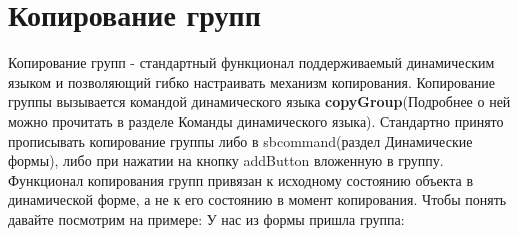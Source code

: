 \documentclass[../index.tex]{subfiles}
\begin{document}
\section{Копирование групп}

Копирование групп - стандартный функционал поддерживаемый динамическим языком и позволяющий гибко настраивать механизм копирования. Копирование группы вызывается командой динамического языка \textbf{copyGroup}(Подробнее о ней можно прочитать в разделе Команды динамического языка). Стандартно принято прописывать копирование группы либо в sbcommand(раздел Динамические формы), либо при нажатии на кнопку addButton вложенную в группу.
Функционал копирования групп привязан к исходному состоянию объекта в динамической форме, а не к его состоянию в момент копирования. Чтобы понять давайте посмотрим на примере:
У нас из формы пришла группа:
\end{document}
